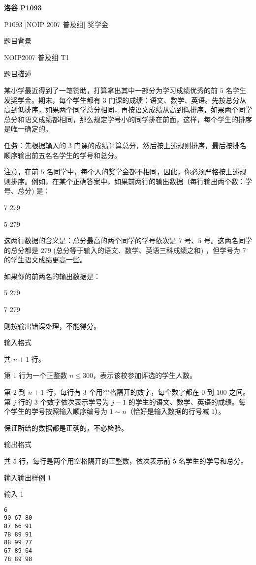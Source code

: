 \documentclass[../main]{subfiles}
\begin{document}
\begin{sloppy}
\textbf{洛谷 P1093}

P1093 [NOIP 2007 普及组] 奖学金

题目背景

NOIP2007 普及组 T1

题目描述

某小学最近得到了一笔赞助，打算拿出其中一部分为学习成绩优秀的前 $5$ 名学生发奖学金。期末，每个学生都有 $3$ 门课的成绩：语文、数学、英语。先按总分从高到低排序，如果两个同学总分相同，再按语文成绩从高到低排序，如果两个同学总分和语文成绩都相同，那么规定学号小的同学排在前面，这样，每个学生的排序是唯一确定的。

任务：先根据输入的 $3$ 门课的成绩计算总分，然后按上述规则排序，最后按排名顺序输出前五名名学生的学号和总分。

注意，在前 $5$ 名同学中，每个人的奖学金都不相同，因此，你必须严格按上述规则排序。例如，在某个正确答案中，如果前两行的输出数据（每行输出两个数：学号、总分) 是：

7 279  

5 279


这两行数据的含义是：总分最高的两个同学的学号依次是 $7$ 号、$5$ 号。这两名同学的总分都是 $279$ (总分等于输入的语文、数学、英语三科成绩之和) ，但学号为 $7$ 的学生语文成绩更高一些。

如果你的前两名的输出数据是：

5 279  

7 279


则按输出错误处理，不能得分。

输入格式

共 $n+1$ 行。

第 $1$ 行为一个正整数 $n \le 300$，表示该校参加评选的学生人数。

第 $2$ 到 $n+1$ 行，每行有 $3$ 个用空格隔开的数字，每个数字都在 $0$ 到 $100$ 之间。第 $j$ 行的 $3$ 个数字依次表示学号为 $j-1$ 的学生的语文、数学、英语的成绩。每个学生的学号按照输入顺序编号为 $1\sim n$（恰好是输入数据的行号减 $1$）。

保证所给的数据都是正确的，不必检验。

输出格式

共 $5$ 行，每行是两个用空格隔开的正整数，依次表示前 $5$ 名学生的学号和总分。

\newpage

输入输出样例 1

输入 1

\begin{verbatim}
6
90 67 80
87 66 91
78 89 91
88 99 77
67 89 64
78 89 98
\end{verbatim}


\end{sloppy}
\end{document}
